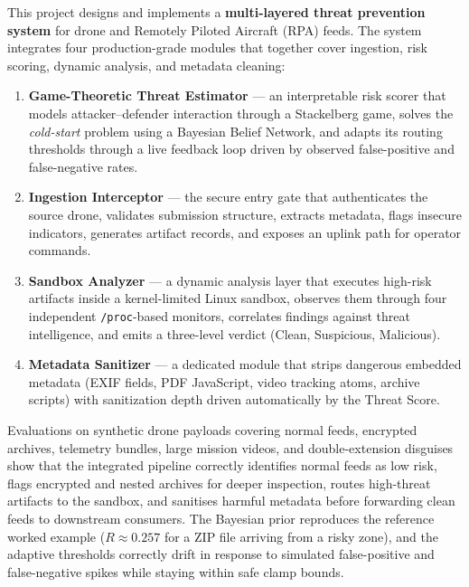\documentclass[12pt, a4paper]{report}
\begin{document}
This project designs and implements a \textbf{multi-layered threat prevention
system} for drone and Remotely Piloted Aircraft (RPA) feeds. The system
integrates four production-grade modules that together cover ingestion, risk
scoring, dynamic analysis, and metadata cleaning:

\begin{enumerate}
    \item \textbf{Game-Theoretic Threat Estimator} — an interpretable risk
          scorer that models attacker--defender interaction through a
          Stackelberg game, solves the \emph{cold-start} problem using a
          Bayesian Belief Network, and adapts its routing thresholds through a
          live feedback loop driven by observed false-positive and
          false-negative rates.
    \item \textbf{Ingestion Interceptor} — the secure entry gate that
          authenticates the source drone, validates submission structure,
          extracts metadata, flags insecure indicators, generates artifact
          records, and exposes an uplink path for operator commands.
    \item \textbf{Sandbox Analyzer} — a dynamic analysis layer that executes
          high-risk artifacts inside a kernel-limited Linux sandbox, observes
          them through four independent \texttt{/proc}-based monitors,
          correlates findings against threat intelligence, and emits a
          three-level verdict (Clean, Suspicious, Malicious).
    \item \textbf{Metadata Sanitizer} — a dedicated module that strips
          dangerous embedded metadata (EXIF fields, PDF JavaScript, video
          tracking atoms, archive scripts) with sanitization depth driven
          automatically by the Threat Score.
\end{enumerate}

Evaluations on synthetic drone payloads covering normal feeds, encrypted
archives, telemetry bundles, large mission videos, and double-extension
disguises show that the integrated pipeline correctly identifies normal
feeds as low risk, flags encrypted and nested archives for deeper
inspection, routes high-threat artifacts to the sandbox, and sanitises
harmful metadata before forwarding clean feeds to downstream consumers.
The Bayesian prior reproduces the reference worked example
($R \approx 0.257$ for a ZIP file arriving from a risky zone), and the
adaptive thresholds correctly drift in response to simulated false-positive
and false-negative spikes while staying within safe clamp bounds.
\end{document}

